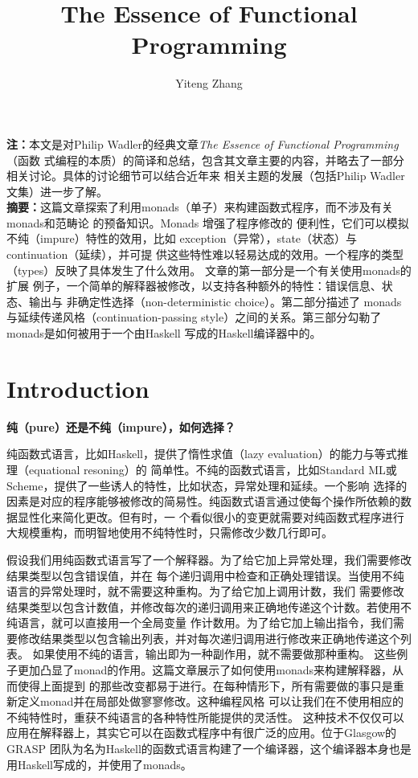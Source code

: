 \documentclass[12pt]{article}
\title{The Essence of Functional Programming}
\author{Yiteng Zhang}
\begin{document}
\maketitle

\noindent{}\textbf{注：}本文是对Philip Wadler的经典文章\textit{The Essence of Functional Programming}（函数
式编程的本质）的简译和总结，包含其文章主要的内容，并略去了一部分相关讨论。具体的讨论细节可以结合近年来
相关主题的发展（包括Philip Wadler文集）进一步了解。
~\\

\noindent{}\textbf{摘要：}这篇文章探索了利用monads（单子）来构建函数式程序，而不涉及有关monads和范畴论
的预备知识。Monads 增强了程序修改的 便利性，它们可以模拟不纯（impure）特性的效用，比如
exception（异常），state（状态）与continuation（延续），并可提
供这些特性难以轻易达成的效用。一个程序的类型（types）反映了具体发生了什么效用。
文章的第一部分是一个有关使用monads的扩展
例子，一个简单的解释器被修改，以支持各种额外的特性：错误信息、状态、输出与
非确定性选择（non-deterministic choice）。第二部分描述了
monads与延续传递风格（continuation-passing style）之间的关系。第三部分勾勒了monads是如何被用于一个由Haskell
写成的Haskell编译器中的。

\section{Introduction}
\noindent{}\textbf{纯（pure）还是不纯（impure），如何选择？}

\indent{}纯函数式语言，比如Haskell，提供了惰性求值（lazy evaluation）的能力与等式推理（equational resoning）的
简单性。不纯的函数式语言，比如Standard ML或Scheme，提供了一些诱人的特性，比如状态，异常处理和延续。一个影响
选择的因素是对应的程序能够被修改的简易性。纯函数式语言通过使每个操作所依赖的数据显性化来简化更改。但有时，一
个看似很小的变更就需要对纯函数式程序进行大规模重构，而明智地使用不纯特性时，只需修改少数几行即可。

\indent{}假设我们用纯函数式语言写了一个解释器。为了给它加上异常处理，我们需要修改结果类型以包含错误值，并在
每个递归调用中检查和正确处理错误。当使用不纯语言的异常处理时，就不需要这种重构。为了给它加上调用计数，我们
需要修改结果类型以包含计数值，并修改每次的递归调用来正确地传递这个计数。若使用不纯语言，就可以直接用一个全局变量
作计数用。为了给它加上输出指令，我们需要修改结果类型以包含输出列表，并对每次递归调用进行修改来正确地传递这个列表。
如果使用不纯的语言，输出即为一种副作用，就不需要做那种重构。
这些例子更加凸显了monad的作用。这篇文章展示了如何使用monads来构建解释器，从而使得上面提到
的那些改变都易于进行。在每种情形下，所有需要做的事只是重新定义monad并在局部处做寥寥修改。这种编程风格
可以让我们在不使用相应的不纯特性时，重获不纯语言的各种特性所能提供的灵活性。
这种技术不仅仅可以应用在解释器上，其实它可以在函数式程序中有很广泛的应用。位于Glasgow的GRASP
团队为名为Haskell的函数式语言构建了一个编译器，这个编译器本身也是用Haskell写成的，并使用了monads。
\end{document}
